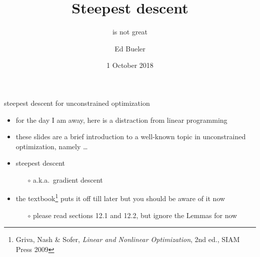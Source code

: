 \documentclass[10pt,hyperref]{beamer}
\title{Steepest descent}
\subtitle{is not great}
\author{Ed Bueler}
\institute[MATH 661]{MATH 661 Optimization}
\date[Fall 2018]{1 October 2018}
\begin{document}
\beamertemplatenavigationsymbolsempty

\begin{frame}
  \maketitle
\end{frame}


\begin{frame}{steepest descent for unconstrained optimization}

\begin{itemize}
\item for the day I am away, here is a distraction from linear programming
\item these slides are a brief introduction to a well-known topic in unconstrained optimization, namely \dots
\item \alert{steepest descent}
    \begin{itemize}
    \item[$\circ$] a.k.a.~gradient descent
    \end{itemize}
\item the textbook\footnote{Griva, Nash \& Sofer, \emph{Linear and Nonlinear Optimization}, 2nd ed., SIAM Press 2009} puts it off till later but you should be aware of it now
    \begin{itemize}
    \item[$\circ$] please read sections 12.1 and 12.2, but ignore the Lemmas for now
    \end{itemize}
\end{itemize}
\end{frame}
\end{document}
